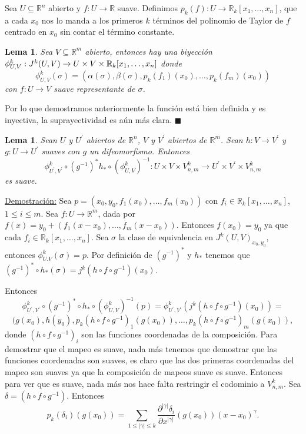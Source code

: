 \documentclass{report}
\newtheorem{lem}[theorem]{Lema}
\theoremstyle{definition}
\begin{document}
Sea $U \subseteq \mathbb{R}^n$ abierto y $f: U \to \mathbb{R}$ suave. Definimos $p_k (f) : U \to \mathbb{R}_k [x_1, \dots, x_n]$, que a cada $x_0$ nos lo manda a los primeros $k$ t\'erminos del polinomio de Taylor de $f$ centrado en $x_0$ sin contar el t\'ermino constante.

\begin{lem}
Sea $V \subseteq \mathbb{R}^m$ abierto, entonces hay una biyecci\'on $\phi_{U,V}^k: \\ J^k(U,V) \to U \times V \times \mathbb{R}_k [x_1, \dots, x_n]$ donde $$\phi_{U,V}^k ( \sigma) = (\alpha (\sigma) , \beta (\sigma) , p_k (f_1) (x_0) , \dots , p_k (f_m) (x_0) )$$
con $f:U \to V$ suave representante de $\sigma$.
\end{lem}

Por lo que demostramos anteriormente la funci\'on est\'a bien definida y es inyectiva, la suprayectividad es a\'un m\'as clara. $\blacksquare$

\begin{lem}
Sean $U$ y $U^\prime$ abiertos de $\mathbb{R}^n$, $V$ y $V^\prime$ abiertos de $\mathbb{R}^m$. Sean $h:V \to V^\prime$ y $g: U \to U^\prime$ suaves con $g$ un difeomorfismo. Entonces $$ \phi_{{U^\prime} , V^\prime}^k \circ (g^{-1})^\ast h_\ast \circ (\phi_{U , V}^k)^{-1} : U \times V \times V_{n, m }^k \to U^\prime \times V^\prime \times V_{n,m}^k$$
es suave.


\end{lem}
\underline{Demostraci\'on:} Sea $p = (x_0 , y_0 , f_1 (x_0) , \dots , f_m (x_0))$ con $f_i \in \mathbb{R}_k [x_1, \dots, x_n]$, $1 \leq i \leq m$. Sea $f: U \to \mathbb{R}^m$, dada por $f(x) = y_0 + (f_1 (x - x_0) ,  \dots , f_m (x - x_0))$. Entonces $f(x_0) = y_0$ ya que cada $f_i \in \mathbb{R}_k [x_1, \dots, x_n]$. Sea $\sigma$ la clase de equivalencia en $J^k (U,V)_{x_0 , y_0}$, entonces $\phi_{U.V}^k (\sigma) = p$. Por definici\'on de  $(g^{-1})^\ast$ y $h_\ast$ tenemos que $(g^{-1})^\ast \circ h_\ast (\sigma) = j^k (h \circ f \circ g^{-1}) (x_0)$.

Entonces $$\phi_{U^\prime , V^\prime}^k \circ (g^{-1})^\ast \circ h_\ast \circ (\phi_{U, V}^k)^{-1} ( p) = \phi^k_{U^\prime , V^\prime} (j^k (h \circ f \circ g^{-1} ) (x_0)) =$$ $$(g(x_0) , h(y_0), p_k (h \circ f \circ g^{-1} )_1 (g(x_0)) , \dots , p_k (h \circ f \circ g^{-1} )_m (g(x_0)),$$
donde $(h \circ f \circ g^{-1})_i$ son las funciones coordenadas de la composici\'on. Para demostrar que el mapeo es suave, nada m\'as tenemos que demostrar que las funciones coordenadas son suaves, es claro que las dos primeras coordenadas del mapeo son suaves ya que la composici\'on de mapeos suave es suave. Entonces para ver que es suave, nada m\'as nos hace falta restringir el codominio a $V_{n,m}^k$. 
Sea $\delta = (h \circ f \circ g^{-1})$. Entonces $$p_k (\delta_i) (g(x_0)) = \sum\limits_{1 \leq \vert \gamma \vert \leq k} \frac{\partial ^{\vert \gamma \vert } \delta_i}{\partial x^{\vert \gamma \vert}} (g(x_0)) (x - x_0)^\gamma .$$
\end{document}
